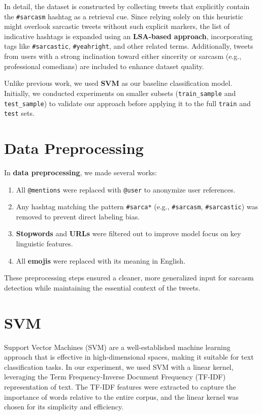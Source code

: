 \documentclass[11pt]{article}
\begin{document}
In detail, the dataset is constructed by collecting tweets that explicitly contain the \texttt{\#sarcasm} hashtag as a retrieval cue. Since relying solely on this heuristic might overlook sarcastic tweets without such explicit markers, the list of indicative hashtags is expanded using an \textbf{LSA-based approach}, incorporating tags like \texttt{\#sarcastic}, \texttt{\#yeahright}, and other related terms. Additionally, tweets from users with a strong inclination toward either sincerity or sarcasm (e.g., professional comedians) are included to enhance dataset quality.

Unlike previous work, we used \textbf{SVM} as our baseline classification model. Initially, we conducted experiments on smaller subsets (\texttt{train\_sample} and \texttt{test\_sample}) to validate our approach before applying it to the full \texttt{train} and \texttt{test} sets.

\section{Data Preprocessing}
In \textbf{data preprocessing}, we made several works:
\begin{enumerate}
    \item All \texttt{@mentions} were replaced with \texttt{@user} to anonymize user references.
    \item Any hashtag matching the pattern \texttt{\#sarca*} (e.g., \texttt{\#sarcasm}, \texttt{\#sarcastic}) was removed to prevent direct labeling bias.
    \item \textbf{Stopwords} and \textbf{URLs} were filtered out to improve model focus on key linguistic features.
    \item All \textbf{emojis} were replaced with its meaning in English.
\end{enumerate}

These preprocessing steps ensured a cleaner, more generalized input for sarcasm detection while maintaining the essential context of the tweets.

\section{SVM}
Support Vector Machines (SVM) are a well-established machine learning approach that is effective in high-dimensional spaces, making it suitable for text classification tasks. In our experiment, we used SVM with a linear kernel, leveraging the Term Frequency-Inverse Document Frequency (TF-IDF) representation of text. The TF-IDF features were extracted to capture the importance of words relative to the entire corpus, and the linear kernel was chosen for its simplicity and efficiency.
\end{document}
